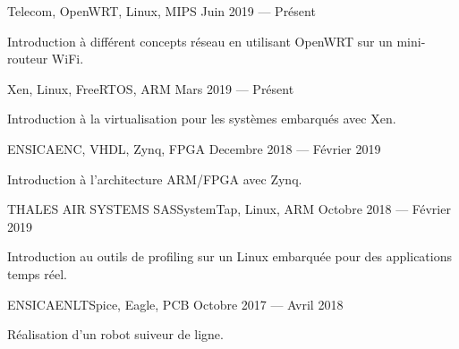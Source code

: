 
            {}{Telecom, OpenWRT, Linux, MIPS}
            {Juin 2019 --- Présent}
            {%
                \begin{additems}
                    \item Introduction à différent concepts réseau en utilisant OpenWRT sur un mini-routeur WiFi.
                \end{additems}
            }

            {}{Xen, Linux, FreeRTOS, ARM}
            {Mars 2019 --- Présent}
            {%
                \begin{additems}
                    \item Introduction à la virtualisation pour les systèmes embarqués avec Xen.
                \end{additems}
            }

            {ENSICAEN}{C, VHDL, Zynq, FPGA}
            {Decembre 2018 --- Février 2019}
            {%
                \begin{additems}
                    \item Introduction à l'architecture ARM/FPGA avec Zynq.
                \end{additems}
            }

            {THALES AIR SYSTEMS SAS}{SystemTap, Linux, ARM}
            {Octobre 2018 --- Février 2019}
            {%
                \begin{additems}
                    \item Introduction au outils de profiling sur un Linux embarquée pour des applications temps réel.
                \end{additems}
            }

            {ENSICAEN}{LTSpice, Eagle, PCB}
            {Octobre 2017 --- Avril 2018}
            {%
                \begin{additems}
                    \item Réalisation d'un robot suiveur de ligne.
                \end{additems}
            }
